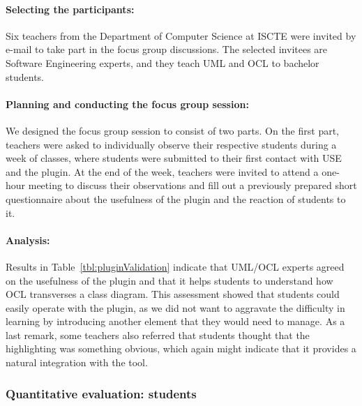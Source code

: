 \paragraph{Selecting the participants:} Six teachers from the Department of Computer Science at ISCTE were invited by e-mail to take part in the focus group discussions. The selected invitees are Software Engineering experts, and they teach UML and OCL to bachelor students.

\paragraph{Planning and conducting the focus group session:} We designed the focus group session to consist of two parts. On the first part, teachers were asked to individually observe their respective students during a week of classes, where students were submitted to their first contact with USE and the plugin. At the end of the week, teachers were invited to attend a one-hour meeting to discuss their observations and fill out a previously prepared short questionnaire about the usefulness of the plugin and the reaction of students to it.

\paragraph{Analysis:} Results in Table~\ref{tbl:pluginValidation} indicate that UML/OCL experts agreed on the usefulness of the plugin and that it helps students to understand how OCL transverses a class diagram. This assessment showed that students could easily operate with the plugin, as we did not want to aggravate the difficulty in learning by introducing another element that they would need to manage. As a last remark, some teachers also referred that students thought that the highlighting was something obvious, which again might indicate that it provides a natural integration with the tool.



\subsubsection{Quantitative evaluation: students}
\label{chap:Results-pluginStudents}

